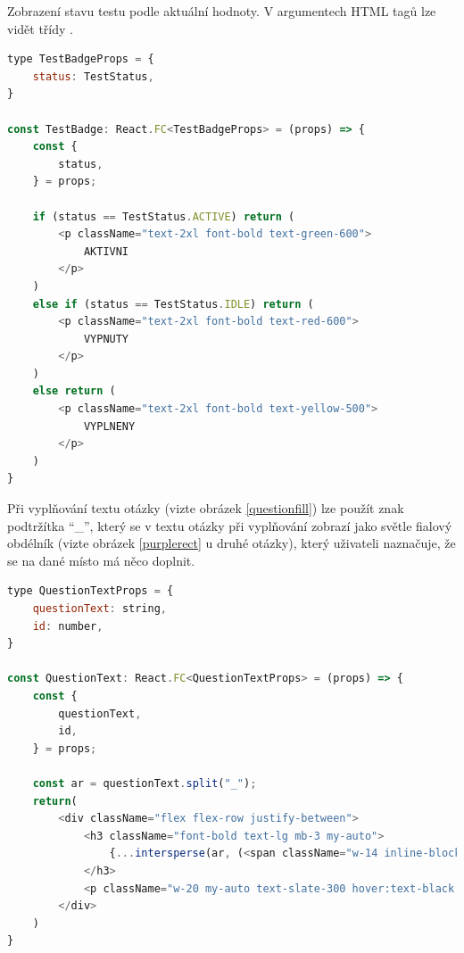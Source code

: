 Zobrazení stavu testu podle aktuální hodnoty. V argumentech  HTML tagů lze vidět třídy .

\begin{lstlisting}[language=JavaScript,caption={Úryvek z \M{/src/pages/admin/tests/index.tsx}; Status testu}]
type TestBadgeProps = {
    status: TestStatus,
}

const TestBadge: React.FC<TestBadgeProps> = (props) => {
    const {
        status,
    } = props;

    if (status == TestStatus.ACTIVE) return (
        <p className="text-2xl font-bold text-green-600">
            AKTIVNI
        </p>
    )
    else if (status == TestStatus.IDLE) return (
        <p className="text-2xl font-bold text-red-600">
            VYPNUTY
        </p>
    )
    else return (
        <p className="text-2xl font-bold text-yellow-500">
            VYPLNENY
        </p>
    )
}
\end{lstlisting}

\newpage
Při vyplňování textu otázky (vizte obrázek \ref{questionfill}) lze použít znak podtržítka \enquote{\_}, který se v textu otázky při vyplňování zobrazí jako světle fialový obdélník (vizte obrázek \ref{purplerect} u druhé otázky), který uživateli naznačuje, že se na dané místo má něco doplnit. 

\begin{lstlisting}[language=JavaScript,caption={Úryvek z \M{/src/pages/test/index.tsx}; komponent textu otázky, výměna znaku \enquote{\_} za fialový obdélník}]
type QuestionTextProps = {
    questionText: string,
    id: number,
}

const QuestionText: React.FC<QuestionTextProps> = (props) => {
    const {
        questionText,
        id,
    } = props;

    const ar = questionText.split("_");
    return(
        <div className="flex flex-row justify-between"> 
            <h3 className="font-bold text-lg mb-3 my-auto">
                {...intersperse(ar, (<span className="w-14 inline-block rounded-lg bg-purple-100 border-2 border-purple-200 mx-1 text-transparent">___</span>))}
            </h3>
            <p className="w-20 my-auto text-slate-300 hover:text-black hover:font-semibold mx-2">id: {id}</p>
        </div>
    )
}
\end{lstlisting}

